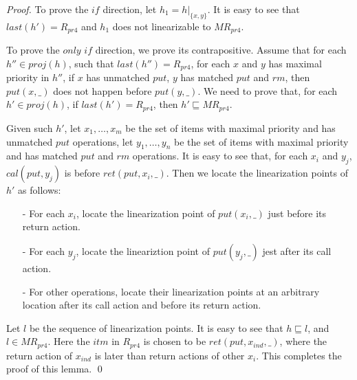 \documentclass{llncs}
\begin{document}
\begin {proof}

To prove the $\textit{if}$ direction, let $h_1 = h \vert_{ \{ x,y \} }$. It is easy to see that $\textit{last}(h') = R_{\textit{pr4}}$ and $h_1$ does not linearizable to $\textit{MR}_{\textit{pr4}}$.

To prove the $\textit{only if}$ direction, we prove its contrapositive. Assume that for each $h'' \in \textit{proj}(h)$, such that $\textit{last}(h'') = R_{\textit{pr4}}$, for each $x$ and $y$ has maximal priority in $h''$, if $x$ has unmatched $\textit{put}$, $y$ has matched $\textit{put}$ and $\textit{rm}$, then $\textit{put}(x,\_)$ does not happen before $\textit{put}(y,\_)$. We need to prove that, for each $h' \in \textit{proj}(h)$, if $\textit{last}(h') = R_{\textit{pr4}}$, then $h' \sqsubseteq \textit{MR}_{\textit{pr4}}$.

Given such $h'$, let $x_1,\ldots,x_m$ be the set of items with maximal priority and has unmatched $\textit{put}$ operations, let $y_1,\ldots,y_n$ be the set of items with maximal priority and has matched $\textit{put}$ and $\textit{rm}$ operations. It is easy to see that, for each $x_i$ and $y_j$, $\textit{cal}(\textit{put},y_j)$ is before $\textit{ret}(\textit{put},x_i,\_)$. Then we locate the linearization points of $h'$ as follows:

\begin{itemize}
\setlength{\itemsep}{0.5pt}
\item[-] For each $x_i$, locate the linearization point of $\textit{put}(x_i,\_)$ just before its return action.

\item[-] For each $y_j$, locate the lineariztion point of $\textit{put}(y_j,\_)$ jest after its call action.

\item[-] For other operations, locate their linearization points at an arbitrary location after its call action and before its return action.
\end{itemize}

Let $l$ be the sequence of linearization points. It is easy to see that $h \sqsubseteq l$, and $l \in \textit{MR}_{\textit{pr4}}$. Here the $\textit{itm}$ in $R_{\textit{pr4}}$ is chosen to be $\textit{ret}(\textit{put},x_{\textit{ind}},\_)$, where the return action of $x_{\textit{ind}}$ is later than return actions of other $x_i$. This completes the proof of this lemma. \qed
\end {proof}
\end{document}
